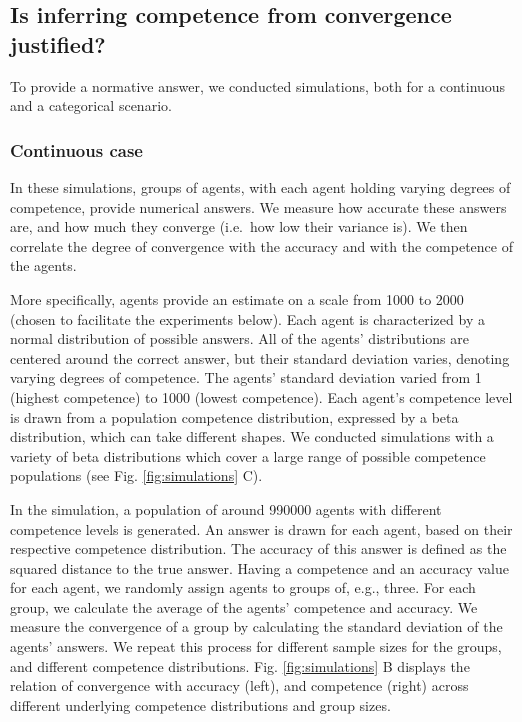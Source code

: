 \documentclass[
  doc,floatsintext]{apa6}
\begin{document}
\hypertarget{is-inferring-competence-from-convergence-justified}{%
\subsection{Is inferring competence from convergence justified?}\label{is-inferring-competence-from-convergence-justified}}

To provide a normative answer, we conducted simulations, both for a continuous and a categorical scenario.

\hypertarget{continuous-case}{%
\subsubsection{Continuous case}\label{continuous-case}}

In these simulations, groups of agents, with each agent holding varying degrees of competence, provide numerical answers. We measure how accurate these answers are, and how much they converge (i.e.~how low their variance is). We then correlate the degree of convergence with the accuracy and with the competence of the agents.

More specifically, agents provide an estimate on a scale from 1000 to 2000 (chosen to facilitate the experiments below). Each agent is characterized by a normal distribution of possible answers. All of the agents' distributions are centered around the correct answer, but their standard deviation varies, denoting varying degrees of competence. The agents' standard deviation varied from 1 (highest competence) to 1000 (lowest competence). Each agent's competence level is drawn from a population competence distribution, expressed by a beta distribution, which can take different shapes. We conducted simulations with a variety of beta distributions which cover a large range of possible competence populations (see Fig. \ref{fig:simulations} C).

In the simulation, a population of around 990000 agents with different competence levels is generated. An answer is drawn for each agent, based on their respective competence distribution. The accuracy of this answer is defined as the squared distance to the true answer. Having a competence and an accuracy value for each agent, we randomly assign agents to groups of, e.g., three. For each group, we calculate the average of the agents' competence and accuracy. We measure the convergence of a group by calculating the standard deviation of the agents' answers. We repeat this process for different sample sizes for the groups, and different competence distributions. Fig. \ref{fig:simulations} B displays the relation of convergence with accuracy (left), and competence (right) across different underlying competence distributions and group sizes.
\end{document}
